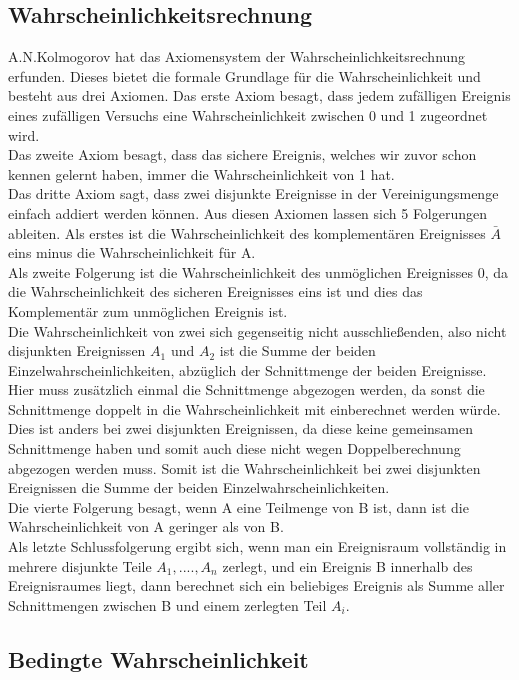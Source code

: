 \documentclass[a4paper]{article}
\newcommand\dangersign[1][2ex]{%
  \renewcommand\stacktype{L}%
  \scaleto{\stackon[1.3pt]{\color{red}$\triangle$}{\tiny !}}{#1}%
}
\begin{document}
\subsection{Wahrscheinlichkeitsrechnung}
A.N.Kolmogorov hat das Axiomensystem der Wahrscheinlichkeitsrechnung erfunden. Dieses bietet die formale Grundlage für die Wahrscheinlichkeit und besteht aus drei Axiomen.
Das erste Axiom besagt, dass jedem zufälligen Ereignis eines zufälligen Versuchs eine Wahrscheinlichkeit zwischen 0 und 1 zugeordnet wird.\\
Das zweite Axiom besagt, dass das sichere Ereignis, welches wir zuvor schon kennen gelernt haben, immer die Wahrscheinlichkeit von 1 hat.\\
Das dritte Axiom sagt, dass zwei disjunkte Ereignisse in der Vereinigungsmenge einfach addiert werden können.
Aus diesen Axiomen lassen sich 5 Folgerungen ableiten. Als erstes ist die Wahrscheinlichkeit des komplementären Ereignisses $\bar A$ eins minus die Wahrscheinlichkeit für A.\\
Als zweite Folgerung ist die Wahrscheinlichkeit des unmöglichen Ereignisses 0, da die Wahrscheinlichkeit des sicheren Ereignisses eins ist und dies das Komplementär zum unmöglichen Ereignis ist.\\
Die Wahrscheinlichkeit von zwei sich gegenseitig nicht ausschließenden, also nicht disjunkten Ereignissen $A_1$ und $A_2$ ist die Summe der beiden Einzelwahrscheinlichkeiten, abzüglich der Schnittmenge der beiden Ereignisse. 
\dangersign Hier muss zusätzlich einmal die Schnittmenge abgezogen werden, da sonst die Schnittmenge doppelt in die Wahrscheinlichkeit mit einberechnet werden würde. Dies ist anders bei zwei disjunkten Ereignissen, da diese keine gemeinsamen Schnittmenge haben und somit auch diese nicht wegen Doppelberechnung abgezogen werden muss. Somit ist die Wahrscheinlichkeit bei zwei disjunkten Ereignissen die Summe der beiden Einzelwahrscheinlichkeiten.\\
Die vierte Folgerung besagt, wenn A eine Teilmenge von B ist, dann ist die Wahrscheinlichkeit von A geringer als von B. \\
Als letzte Schlussfolgerung ergibt sich, wenn man ein Ereignisraum vollständig in mehrere disjunkte Teile $A_1,....,A_n$ zerlegt, und ein Ereignis B innerhalb des Ereignisraumes liegt, dann berechnet sich ein beliebiges Ereignis als Summe aller Schnittmengen zwischen B und einem zerlegten Teil $A_i$.

\subsection{Bedingte Wahrscheinlichkeit}
\end{document}

